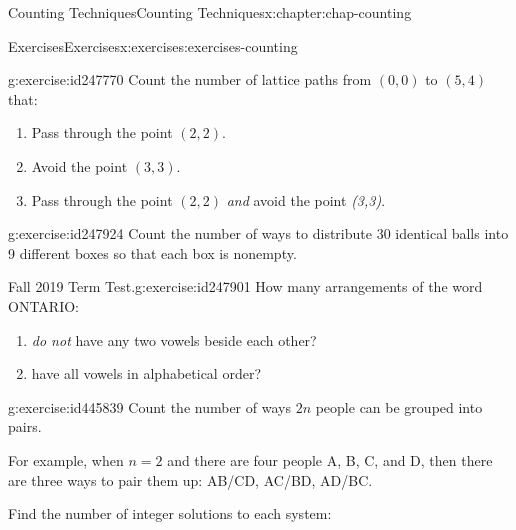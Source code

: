 \documentclass[oneside,10pt,]{book}
\numberwithin{equation}{section}
\begin{document}
\begin{chapterptx}{Counting Techniques}{}{Counting Techniques}{}{}{x:chapter:chap-counting}
\begin{exercises-section}{Exercises}{}{Exercises}{}{}{x:exercises:exercises-counting}
\begin{divisionexercise}{15}{}{}{g:exercise:id247770}
Count the number of lattice paths from \((0,0)\) to \((5,4)\) that:%
\begin{enumerate}[label=(\alph*)]
\item{}Pass through the point \((2,2)\).%
\item{}Avoid the point \((3,3)\).%
\item{}Pass through the point \((2,2)\) \emph{and} avoid the point \emph{(3,3)}.%
\end{enumerate}
%
\begin{sidebyside}{1}{0.3}{0.3}{0}%
\begin{sbspanel}{0.4}%
%
\end{sbspanel}%
\end{sidebyside}%
\end{divisionexercise}%
\begin{divisionexercise}{16}{}{}{g:exercise:id247924}%
Count the number of ways to distribute 30 identical balls into 9 different boxes so that each box is nonempty.%
\end{divisionexercise}%
\begin{divisionexercise}{17}{Fall 2019 Term Test.}{}{g:exercise:id247901}%
How many arrangements of the word ONTARIO:%
\begin{enumerate}[label=(\alph*)]
\item{}\emph{do not} have any two vowels beside each other?%
\item{}have all vowels in alphabetical order?%
\end{enumerate}
%
\end{divisionexercise}%
\begin{divisionexercise}{18}{}{}{g:exercise:id445839}%
Count the number of ways \(2n\) people can be grouped into pairs.%
\par
For example, when \(n = 2\) and there are four people A, B, C, and D, then there are three ways to pair them up: AB\slash{}CD, AC\slash{}BD, AD\slash{}BC.%
\end{divisionexercise}%
\par\medskip\noindent%
%
Find the number of integer solutions to each system:%
\begin{exercisegroup}

\end{exercisegroup}
\end{exercises-section}
\end{chapterptx}
\end{document}
